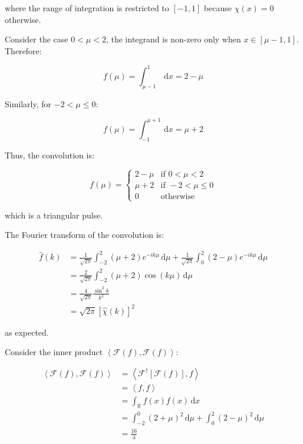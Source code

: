 \documentclass[12pt]{article}
\begin{document}
where the range of integration is restricted to $[-1, 1]$ because $\chi(x) = 0$ otherwise.

Consider the case $0 < \mu < 2$, the integrand is non-zero only when $x \in [\mu - 1, 1]$. Therefore:

\begin{equation}
    f(\mu) = \int_{\mu - 1}^{1} \, \mathrm{d}x = 2 - \mu
\end{equation}

Similarly, for $-2 < \mu \le 0$:

\begin{equation}
    f(\mu) = \int_{-1}^{\mu + 1} \, \mathrm{d}x = \mu + 2
\end{equation}

Thus, the convolution is:

\begin{equation}
    f(\mu) =
    \begin{cases}
        2 - \mu & \text{if } 0 < \mu < 2 \\
        \mu + 2 & \text{if } -2 < \mu \le 0 \\
        0 & \text{otherwise}
    \end{cases}
\end{equation}

which is a triangular pulse.

The Fourier transform of the convolution is:

\begin{equation}
\begin{split}
    \hat{f}(k) &= \frac{1}{\sqrt{2\pi}} \int_{-2}^{2} (\mu + 2) e^{-ik\mu} \, \mathrm{d}\mu + \frac{1}{\sqrt{2\pi}} \int_{0}^{2} (2 - \mu) e^{-ik\mu} \, \mathrm{d}\mu \\
    &= \frac{2}{\sqrt{2\pi}} \int_{-2}^{2} (\mu + 2) \cos{(k\mu)} \, \mathrm{d}\mu \\
    &= \frac{4}{\sqrt{2\pi}} \frac{\sin^{2}{k}}{k^{2}} \\
    &= \sqrt{2\pi} \left[ \hat{\chi}(k) \right]^{2}
\end{split}
\end{equation}

as expected.

Consider the inner product $\left\langle \mathcal{F}(f), \mathcal{F}(f) \right\rangle$:

\begin{equation}
\begin{split}
    \left\langle \mathcal{F}(f), \mathcal{F}(f) \right\rangle &= \left\langle \mathcal{F}^{\dagger}[\mathcal{F}(f)], f \right\rangle \\
    &= \left\langle f, f \right\rangle \\
    &= \int_{\mathbb{R}} f(x) f(x) \, \mathrm{d}x \\
    &= \int_{-2}^{0} (2 + \mu)^{2} \, \mathrm{d}\mu + \int_{0}^{2} (2 - \mu)^{2} \, \mathrm{d}\mu \\
    &= \frac{16}{3}
\end{split}
\end{equation}
\end{document}
